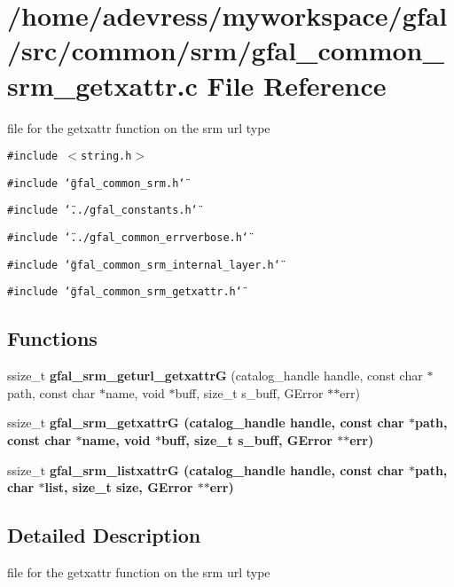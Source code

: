 \section{/home/adevress/myworkspace/gfal/src/common/srm/gfal\_\-common\_\-srm\_\-getxattr.c File Reference}
\label{gfal__common__srm__getxattr_8c}
file for the getxattr function on the srm url type 

{\tt \#include $<$string.h$>$}\par
{\tt \#include \char`\"{}gfal\_\-common\_\-srm.h\char`\"{}}\par
{\tt \#include \char`\"{}../gfal\_\-constants.h\char`\"{}}\par
{\tt \#include \char`\"{}../gfal\_\-common\_\-errverbose.h\char`\"{}}\par
{\tt \#include \char`\"{}gfal\_\-common\_\-srm\_\-internal\_\-layer.h\char`\"{}}\par
{\tt \#include \char`\"{}gfal\_\-common\_\-srm\_\-getxattr.h\char`\"{}}\par
\subsection*{Functions}
\begin{CompactItemize}
\item 
ssize\_\-t \textbf{gfal\_\-srm\_\-geturl\_\-getxattr\-G} (catalog\_\-handle handle, const char $\ast$path, const char $\ast$name, void $\ast$buff, size\_\-t s\_\-buff, GError $\ast$$\ast$err)\label{gfal__common__srm__getxattr_8c_d5291130be29d310bb248c908379b5b9}

\item 
ssize\_\-t \bf{gfal\_\-srm\_\-getxattr\-G} (catalog\_\-handle handle, const char $\ast$path, const char $\ast$name, void $\ast$buff, size\_\-t s\_\-buff, GError $\ast$$\ast$err)
\item 
ssize\_\-t \bf{gfal\_\-srm\_\-listxattr\-G} (catalog\_\-handle handle, const char $\ast$path, char $\ast$list, size\_\-t size, GError $\ast$$\ast$err)
\end{CompactItemize}


\subsection{Detailed Description}
file for the getxattr function on the srm url type 

